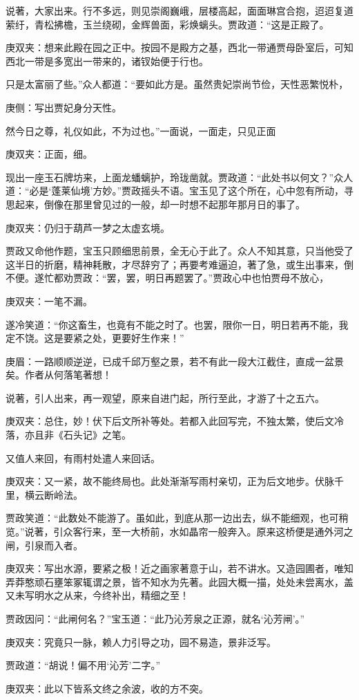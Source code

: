 \begin{parag}
    说著，大家出来。行不多远，则见崇阁巍峨，层楼高起，面面琳宫合抱，迢迢复道萦纡，青松拂檐，玉兰绕砌，金辉兽面，彩焕螭头。贾政道：“这是正殿了。\begin{note}庚双夹：想来此殿在园之正中。按园不是殿方之基，西北一带通贾母卧室后，可知西北一带是多宽出一带来的，诸钗始便于行也。\end{note}只是太富丽了些。”众人都道：“要如此方是。虽然贵妃崇尚节俭，天性恶繁悦朴，\begin{note}庚侧：写出贾妃身分天性。\end{note}然今日之尊，礼仪如此，不为过也。”一面说，一面走，只见正面\begin{note}庚双夹：正面，细。\end{note}现出一座玉石牌坊来，上面龙蟠螭护，玲珑凿就。贾政道：“此处书以何文？”众人道：“必是‘蓬莱仙境’方妙。”贾政摇头不语。宝玉见了这个所在，心中忽有所动，寻思起来，倒像在那里曾见过的一般，却一时想不起那年那月日的事了。\begin{note}庚双夹：仍归于葫芦一梦之太虚玄境。\end{note}贾政又命他作题，宝玉只顾细思前景，全无心于此了。众人不知其意，只当他受了这半日的折磨，精神耗散，才尽辞穷了；再要考难逼迫，著了急，或生出事来，倒不便。遂忙都劝贾政：“罢，罢，明日再题罢了。”贾政心中也怕贾母不放心，\begin{note}庚双夹：一笔不漏。\end{note}遂冷笑道：“你这畜生，也竟有不能之时了。也罢，限你一日，明日若再不能，我定不饶。这是要紧之处，更要好生作来！”\begin{note}庚眉：一路顺顺逆逆，已成千邱万壑之景，若不有此一段大江截住，直成一盆景矣。作者从何落笔著想！\end{note}
\end{parag}


\begin{parag}
    说著，引人出来，再一观望，原来自进门起，所行至此，才游了十之五六。\begin{note}庚双夹：总住，妙！伏下后文所补等处。若都入此回写完，不独太繁，使后文冷落，亦且非《石头记》之笔。\end{note}又值人来回，有雨村处遣人来回话。\begin{note}庚双夹：又一紧，故不能终局也。此处渐渐写雨村亲切，正为后文地步。伏脉千里，横云断岭法。\end{note}贾政笑道：“此数处不能游了。虽如此，到底从那一边出去，纵不能细观，也可稍览。”说著，引众客行来，至一大桥前，水如晶帘一般奔入。原来这桥便是通外河之闸，引泉而入者。\begin{note}庚双夹：写出水源，要紧之极！近之画家著意于山，若不讲水。又造园圃者，唯知弄莽憨顽石壅笨冢辄谓之景，皆不知水为先著。此园大概一描，处处未尝离水，盖又未写明水之从来，今终补出，精细之至！\end{note}贾政因问：“此闸何名？”宝玉道：“此乃沁芳泉之正源，就名‘沁芳闸’。”\begin{note}庚双夹：究竟只一脉，赖人力引导之功，园不易造，景非泛写。\end{note}贾政道：“胡说！偏不用‘沁芳’二字。”\begin{note}庚双夹：此以下皆系文终之余波，收的方不突。\end{note}
\end{parag}



